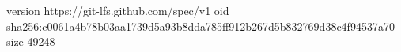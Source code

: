 version https://git-lfs.github.com/spec/v1
oid sha256:c0061a4b78b03aa1739d5a93b8dda785ff912b267d5b832769d38c4f94537a70
size 49248
